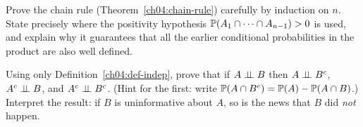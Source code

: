 \begin{exercise}
\label{ch04:exer-proof}
Prove the chain rule (Theorem~\ref{ch04:chain-rule}) carefully by induction on $n$. State precisely where the positivity hypothesis $\P(A_1\cap\cdots\cap A_{n-1}) > 0$ is used, and explain why it guarantees that all the earlier conditional probabilities in the product are also well defined.
\end{exercise}

\begin{exercise}
\label{ch04:exer-symmetry}
Using only Definition~\ref{ch04:def-indep}, prove that if $A \indep B$ then $A \indep B^c$, $A^c \indep B$, and $A^c \indep B^c$. (Hint for the first: write $\P(A\cap B^c) = \P(A) - \P(A\cap B)$.) Interpret the result: if $B$ is uninformative about $A$, so is the news that $B$ did \emph{not} happen.
\end{exercise}
